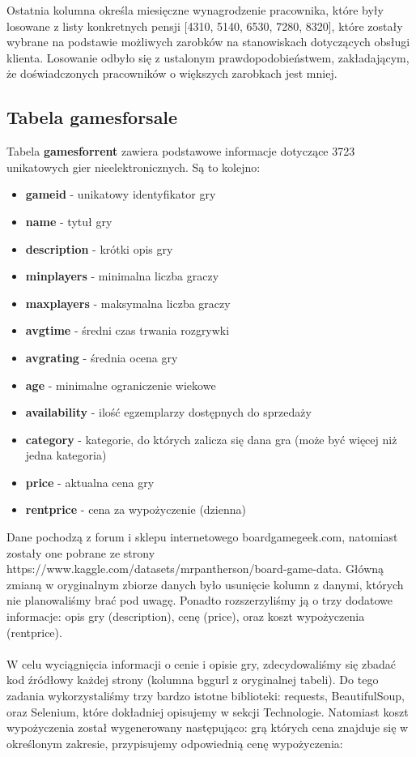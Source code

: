\documentclass{article}
\begin{document}
		\noindent Ostatnia kolumna określa miesięczne wynagrodzenie pracownika, które były losowane z listy konkretnych pensji [4310, 5140, 6530, 7280, 8320], które zostały wybrane na podstawie możliwych zarobków na stanowiskach dotyczących obsługi klienta. Losowanie odbyło się z ustalonym prawdopodobieństwem, zakładającym, że doświadczonych pracowników o większych zarobkach jest mniej.
		
	\subsection{Tabela games\textunderscore for\textunderscore sale}
	Tabela \textbf{games\textunderscore for\textunderscore rent} zawiera podstawowe informacje dotyczące 3723 unikatowych gier nieelektronicznych. Są to kolejno:
	\begin{itemize}
		\setlength{\itemsep}{-2pt}
		\item \textbf{game\textunderscore id} - unikatowy identyfikator gry
		\item \textbf{name} - tytuł gry
		\item \textbf{description} - krótki opis gry
		\item \textbf{min\textunderscore players} - minimalna liczba graczy
		\item \textbf{max\textunderscore players} - maksymalna liczba graczy
		\item \textbf{avg\textunderscore time} - średni czas trwania rozgrywki
		\item  \textbf{avg\textunderscore rating} - średnia ocena gry
		\item \textbf{age} - minimalne ograniczenie wiekowe
		\item \textbf{availability} - ilość egzemplarzy dostępnych do sprzedaży
		\item  \textbf{category} - kategorie, do których zalicza się dana gra (może być więcej niż jedna kategoria)
		\item \textbf{price} - aktualna cena gry
		\item \textbf{rent\textunderscore price} - cena za wypożyczenie (dzienna)
	\end{itemize}
	
	\noindent Dane pochodzą z forum i sklepu internetowego boardgamegeek.com, natomiast zostały one pobrane ze strony https://www.kaggle.com/datasets/mrpantherson/board-game-data.
	Główną zmianą w oryginalnym zbiorze danych było usunięcie kolumn z danymi, których nie planowaliśmy brać pod uwagę. Ponadto rozszerzyliśmy ją o trzy dodatowe informacje: opis gry (description), cenę (price), oraz koszt wypożyczenia (rent\textunderscore price). \\ \\
	W celu wyciągnięcia informacji o cenie i opisie gry, zdecydowaliśmy się zbadać kod źródłowy każdej strony (kolumna bgg\textunderscore url z oryginalnej tabeli). Do tego zadania wykorzystaliśmy trzy bardzo istotne biblioteki: requests, BeautifulSoup, oraz Selenium, które dokładniej opisujemy w sekcji Technologie. Natomiast koszt wypożyczenia został wygenerowany następująco: grą których cena znajduje się w określonym zakresie, przypisujemy odpowiednią cenę wypożyczenia:
	
\end{document}
